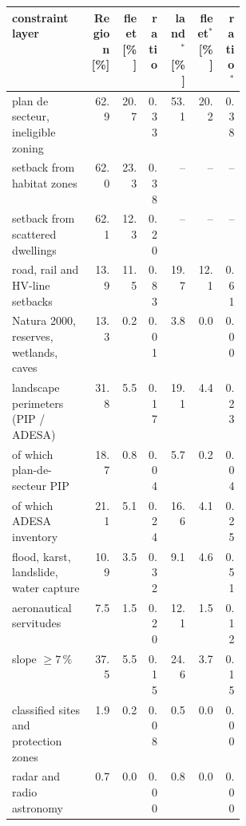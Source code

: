 \begin{tabular}{p{0.34\linewidth}rrrrrr}
\toprule
constraint layer & Region [\%] & fleet [\%] & ratio & land$^*$ [\%] & fleet$^*$ [\%] & ratio$^*$ \\
\midrule
plan de secteur, ineligible zoning & 62.9 & 20.7 & 0.33 & 53.1 & 20.2 & 0.38 \\
setback from habitat zones & 62.0 & 23.3 & 0.38 & -- & -- & -- \\
setback from scattered dwellings & 62.1 & 12.3 & 0.20 & -- & -- & -- \\
road, rail and HV-line setbacks & 13.9 & 11.5 & 0.83 & 19.7 & 12.1 & 0.61 \\
Natura 2000, reserves, wetlands, caves & 13.3 & 0.2 & 0.01 & 3.8 & 0.0 & 0.00 \\
landscape perimeters (PIP / ADESA) & 31.8 & 5.5 & 0.17 & 19.1 & 4.4 & 0.23 \\
\quad of which plan-de-secteur PIP & 18.7 & 0.8 & 0.04 & 5.7 & 0.2 & 0.04 \\
\quad of which ADESA inventory & 21.1 & 5.1 & 0.24 & 16.6 & 4.1 & 0.25 \\
flood, karst, landslide, water capture & 10.9 & 3.5 & 0.32 & 9.1 & 4.6 & 0.51 \\
aeronautical servitudes & 7.5 & 1.5 & 0.20 & 12.1 & 1.5 & 0.12 \\
slope $\geq 7\,\%$ & 37.5 & 5.5 & 0.15 & 24.6 & 3.7 & 0.15 \\
classified sites and protection zones & 1.9 & 0.2 & 0.08 & 0.5 & 0.0 & 0.00 \\
radar and radio astronomy & 0.7 & 0.0 & 0.00 & 0.8 & 0.0 & 0.00 \\
\bottomrule
\end{tabular}